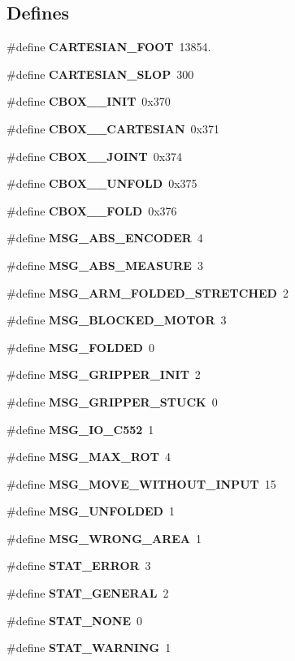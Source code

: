 \subsection*{\-Defines}
\begin{DoxyCompactItemize}
\item 
\#define {\bf \-C\-A\-R\-T\-E\-S\-I\-A\-N\-\_\-\-F\-O\-O\-T}~13854.
\item 
\#define {\bf \-C\-A\-R\-T\-E\-S\-I\-A\-N\-\_\-\-S\-L\-O\-P}~300
\item 
\#define {\bf \-C\-B\-O\-X\-\_\-\_\-\-I\-N\-I\-T}~0x370
\item 
\#define {\bf \-C\-B\-O\-X\-\_\-\_\-\-C\-A\-R\-T\-E\-S\-I\-A\-N}~0x371
\item 
\#define {\bf \-C\-B\-O\-X\-\_\-\_\-\-J\-O\-I\-N\-T}~0x374
\item 
\#define {\bf \-C\-B\-O\-X\-\_\-\_\-\-U\-N\-F\-O\-L\-D}~0x375
\item 
\#define {\bf \-C\-B\-O\-X\-\_\-\_\-\-F\-O\-L\-D}~0x376
\item 
\#define {\bf \-M\-S\-G\-\_\-\-A\-B\-S\-\_\-\-E\-N\-C\-O\-D\-E\-R}~4
\item 
\#define {\bf \-M\-S\-G\-\_\-\-A\-B\-S\-\_\-\-M\-E\-A\-S\-U\-R\-E}~3
\item 
\#define {\bf \-M\-S\-G\-\_\-\-A\-R\-M\-\_\-\-F\-O\-L\-D\-E\-D\-\_\-\-S\-T\-R\-E\-T\-C\-H\-E\-D}~2
\item 
\#define {\bf \-M\-S\-G\-\_\-\-B\-L\-O\-C\-K\-E\-D\-\_\-\-M\-O\-T\-O\-R}~3
\item 
\#define {\bf \-M\-S\-G\-\_\-\-F\-O\-L\-D\-E\-D}~0
\item 
\#define {\bf \-M\-S\-G\-\_\-\-G\-R\-I\-P\-P\-E\-R\-\_\-\-I\-N\-I\-T}~2
\item 
\#define {\bf \-M\-S\-G\-\_\-\-G\-R\-I\-P\-P\-E\-R\-\_\-\-S\-T\-U\-C\-K}~0
\item 
\#define {\bf \-M\-S\-G\-\_\-\-I\-O\-\_\-C552}~1
\item 
\#define {\bf \-M\-S\-G\-\_\-\-M\-A\-X\-\_\-\-R\-O\-T}~4
\item 
\#define {\bf \-M\-S\-G\-\_\-\-M\-O\-V\-E\-\_\-\-W\-I\-T\-H\-O\-U\-T\-\_\-\-I\-N\-P\-U\-T}~15
\item 
\#define {\bf \-M\-S\-G\-\_\-\-U\-N\-F\-O\-L\-D\-E\-D}~1
\item 
\#define {\bf \-M\-S\-G\-\_\-\-W\-R\-O\-N\-G\-\_\-\-A\-R\-E\-A}~1
\item 
\#define {\bf \-S\-T\-A\-T\-\_\-\-E\-R\-R\-O\-R}~3
\item 
\#define {\bf \-S\-T\-A\-T\-\_\-\-G\-E\-N\-E\-R\-A\-L}~2
\item 
\#define {\bf \-S\-T\-A\-T\-\_\-\-N\-O\-N\-E}~0
\item 
\#define {\bf \-S\-T\-A\-T\-\_\-\-W\-A\-R\-N\-I\-N\-G}~1
\end{DoxyCompactItemize}
